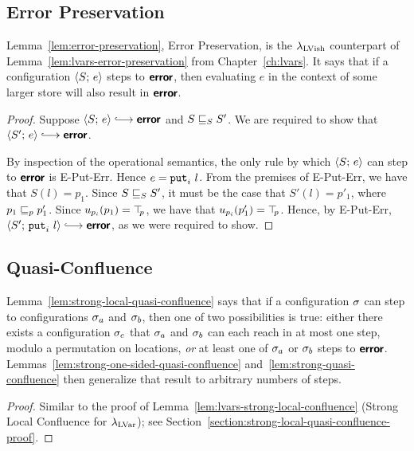 \subsection{Error Preservation}

Lemma~\ref{lem:error-preservation}, Error Preservation, is the
$\lambda_{\textrm{LVish}}$ counterpart of Lemma~\ref{lem:lvars-error-preservation}
from Chapter~\ref{ch:lvars}.  It says that if a configuration
$\langle S;\, e \rangle$ steps to $\textbf{\textsf{error}}$, then evaluating $e$ in the context
of some larger store will also result in $\textbf{\textsf{error}}$.

\LemErrorPreservation
\begin{proof}
  Suppose $\config{S}{e} \parstepsto \error$ and
  $S \sqsubseteq_S S'$. We are required to show that $\config{S'}{e}
  \parstepsto \error$.

  By inspection of the operational semantics, the only rule by which
  $\langle S;\, e \rangle$ can step to $\textbf{\textsf{error}}$ is {\sc E-Put-Err}.  Hence $e =
  \mbox{\texttt{put}}_i~l$.  From the premises of {\sc E-Put-Err}, we have that
  $S(l) = p_1$.  Since $S \sqsubseteq_S S'$, it must be the case that
  $S'(l) = p'_1$, where $p_1 \sqsubseteq_p p'_1$.  Since $u_{p_i}(p_1) =
  \top\hspace{-0.85mm}_{p}$, we have that $u_{p_i}(p'_1) = \top\hspace{-0.85mm}_{p}$.  Hence, by {\sc
    E-Put-Err}, $\config{S'}{\putiexp{l}} \parstepsto \error$, as we
  were required to show.
\end{proof}

\subsection{Quasi-Confluence}\label{subsection:quasi-quasi-confluence}

Lemma~\ref{lem:strong-local-quasi-confluence} says that if a
configuration $\sigma$ can step to configurations $\sigma_a$ and
$\sigma_b$, then one of two possibilities is true: either there exists
a configuration $\sigma_c$ that $\sigma_a$ and $\sigma_b$ can each reach
in at most one step, modulo a permutation on locations, \emph{or} at
least one of $\sigma_a$ or $\sigma_b$ steps to $\textbf{\textsf{error}}$.
Lemmas~\ref{lem:strong-one-sided-quasi-confluence}
and~\ref{lem:strong-quasi-confluence} then generalize that result to
arbitrary numbers of steps.

\LemStrongLocalQuasiConfluence
\begin{proof}
  Similar to the proof of
  Lemma~\ref{lem:lvars-strong-local-confluence} (Strong Local
  Confluence for $\lambda_{\textrm{LVar}}$); see
  Section~\ref{section:strong-local-quasi-confluence-proof}.
\end{proof}

